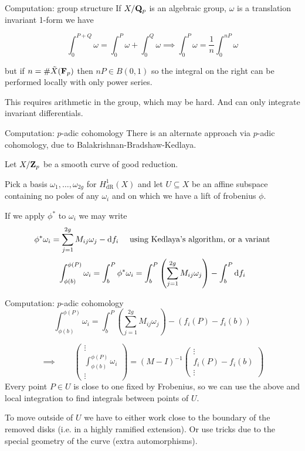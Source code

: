 \begin{frame}{Computation: group structure}
    If $X/\mathbf Q_p$ is an algebraic group, $\omega $ is a translation invariant 1-form we have

    \[\int_0^{P+Q} \omega  = \int_0^P \omega + \int_0^Q \omega \implies \int_0^{P} \omega  = \frac 1n\int_0^{nP} \omega \]

    but if $n = \# \tilde X(\mathbf F_p)$ then $nP \in B(0,1)$ so the integral on the right can be performed locally with only power series.

    \pause
    This requires arithmetic in the group, which may be hard.
    And can only integrate invariant differentials.


\end{frame}

\begin{frame}{Computation: $p$-adic cohomology}
    There is an alternate approach via $p$-adic cohomology, due to Balakrishnan-Bradshaw-Kedlaya.

    Let $X/\mathbf{Z}_p$ be a smooth curve of good reduction.

    Pick a basis $\omega_1, \ldots, \omega_{2g}$ for $H^1_\mathrm{dR}(X)$ and let $U \subseteq X$ be an affine subspace containing no poles of any $\omega_i$ and on which we have a lift of frobenius $\phi$.\pause

    If we apply $\phi^*$ to $\omega_i$ we may write
    \[\phi^* \omega_i = \sum_{j=1}^{2g} M_{ij} \omega_j  - \mathop{}\!\mathrm{d} f_i\quad\text{ using Kedlaya's algorithm, or a variant}\]\pause
    \[\int_{\phi(b)}^{\phi(P)} \omega_i = \int_b^P \phi^* \omega_i = \int_b^P \left(\sum_{j=1}^{2g} M_{ij} \omega_j\right)  - \int_b^P \mathop{}\!\mathrm{d} f_i\]

\end{frame}

\begin{frame}{Computation: $p$-adic cohomology}
    \[\int_{\phi(b)}^{\phi(P)} \omega_i = \int_b^P \left(\sum_{j=1}^{2g} M_{ij} \omega_j\right)  - \left( f_i(P) - f_i(b) \right)\]

    \begin{equation*}
        \implies \qquad
        \left(\begin{smallmatrix} \vdots \\ \int_{\phi(b)}^{\phi(P)} \omega_i \\\vdots \end{smallmatrix}\right) = (M - I)^{-1} \left(\begin{smallmatrix}\vdots \\ f_i(P) - f_i(b) \\ \vdots \end{smallmatrix}\right)
    \end{equation*}\pause
    Every point $P\in U$ is close to one fixed by Frobenius, so we can use the above and local integration to find integrals between points of $U$.\pause

    To move outside of $U$ we have to either work close to the boundary of the removed disks (i.e. in a highly ramified extension). Or use tricks due to the special geometry of the curve (extra automorphisms).
\end{frame}

